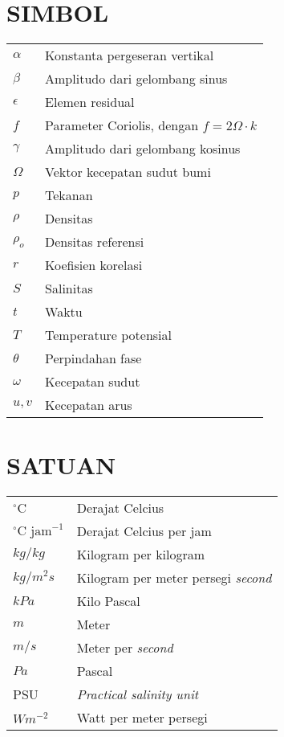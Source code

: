 \section*{SIMBOL}
	\begin{tabular}{ll}
		$\alpha$ & Konstanta pergeseran vertikal\\
		$\beta$ & Amplitudo dari gelombang sinus\\
		$\epsilon$ & Elemen residual\\
		$f$ & Parameter Coriolis, dengan $f=2\Omega \cdot k$\\
		$\gamma$ & Amplitudo dari gelombang kosinus\\
		$\Omega$ & Vektor kecepatan sudut bumi \\
		$p$ & Tekanan \\
		$\rho$ & Densitas \\
		$\rho_o$ & Densitas referensi\\
		$r$ & Koefisien korelasi \\
		$S$ & Salinitas\\
		$t$ & Waktu\\
		$T$ & Temperature potensial\\
		$\theta$ & Perpindahan fase\\
		$\omega$ & Kecepatan sudut \\
		$u,v$ & Kecepatan arus\\
		
	\end{tabular}	
\section*{SATUAN}
	\begin{tabular}{ll}
		$^\circ$C & Derajat Celcius \\
		$^\circ \text{C jam}^{-1}$ & Derajat Celcius per jam\\
		$kg/kg$ & Kilogram per kilogram\\
		$kg/m^2s$ & Kilogram per meter persegi \textit{second}\\
		$kPa$ & Kilo Pascal\\
		$m$ & Meter\\
		$m/s$ & Meter per \textit{second}\\
		$Pa$ & Pascal\\
		PSU & \textit{Practical salinity unit} \\
		$Wm^{-2}$ & Watt per meter persegi\\
		
	\end{tabular}

